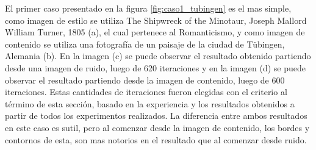 \documentclass[a4paper,11pt,spanish]{book}
\begin{document}
      El primer caso presentado en la figura \ref{fig:caso1_tubingen} es el mas simple, como imagen de estilo se utiliza The Shipwreck of the Minotaur, Joseph Mallord William Turner, 1805 (a),
      el cual pertenece al Romanticismo, y como imagen de contenido se utiliza una fotografía de un paisaje de la ciudad de T\"{u}bingen, Alemania (b).
      En la imagen (c) se puede observar el resultado obtenido partiendo desde una imagen de ruido, luego de 620 iteraciones y en la imagen (d) se puede observar el resultado partiendo desde
      la imagen de contenido, luego de 600 iteraciones.
      Estas cantidades de iteraciones fueron elegidas con el criterio al término de esta sección, basado en la experiencia y los resultados obtenidos a partir de todos 
      los experimentos realizados.
      La diferencia entre ambos resultados en este caso es sutil, pero al comenzar desde la imagen de contenido, los bordes y contornos de esta, son mas notorios en el resultado
      que al comenzar desde ruido.
\end{document}
